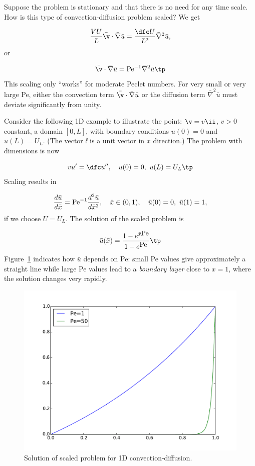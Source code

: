 \documentclass[graybox,envcountchap,sectrefs,final]{svmonodo}
\begin{document}
Suppose the problem is stationary and that there is no need for
any time scale. How is this type of convection-diffusion problem
scaled? We get

\[
\frac{VU}{L}\bar\v\cdot\bar\nabla\bar u =
\frac{\dfc U}{L^2}\bar\nabla^2\bar u,
\]
or

\begin{equation}
\bar\v\cdot\bar\nabla\bar u =
\hbox{Pe}^{-1}\bar\nabla^2\bar u\tp
\label{scale:convdiff:pde1:d3}
\end{equation}
This scaling only ``works'' for moderate Peclet numbers. For very small or
very large Pe, either the convection term $\bar\v\cdot\bar\nabla\bar u$
or the diffusion term $\bar\nabla^2\bar u$ must deviate significantly
from unity.

Consider the following 1D example to illustrate the point: $\v = v\ii$,
$v>0$ constant, a domain $[0,L]$, with boundary conditions $u(0)=0$ and
$u(L)=U_L$. (The vector $\ii$ is a unit vector in $x$ direction.)
The problem with dimensions is now

\[ vu^{\prime} = \dfc u^{\prime\prime},\quad u(0)=0,\ u(L)=U_L\tp\]
Scaling results in

\[ \frac{d\bar u}{d\bar x} = \hbox{Pe}^{-1}\frac{d^2\bar u}{d\bar x^2},\quad
\bar x\in (0,1),\quad \bar u(0)=0,\ \bar u(1) = 1,\]
if we choose $U=U_L$. The solution of the scaled problem is

\[ \bar u(\bar x) = \frac{1 - e^{\bar x\hbox{Pe}}}{1 - e^{\hbox{Pe}}}\tp\]
Figure~\ref{scale:convdiff:fig:scaled} indicates how $\bar u$ depends on
Pe: small Pe values give approximately a straight line while large Pe
values lead to a \emph{boundary layer} close to $x=1$, where the solution
changes very rapidly.


\begin{figure}[!ht]  %
  \centerline{\includegraphics[width=0.9\linewidth]{fig-scaling/boundary_layer1D.pdf}}
  \caption{
  Solution of scaled problem for 1D convection-diffusion. \label{scale:convdiff:fig:scaled}
  }
\end{figure}
\end{document}

